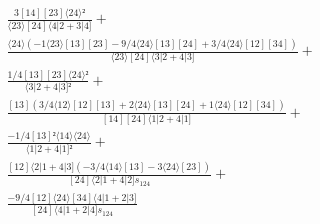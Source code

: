 \documentclass[varwidth, border=5pt]{standalone}
\begin{document}
\begin{my}
$\begin{gathered}
\scriptscriptstyle\frac{3[14][23]⟨24⟩²}{⟨23⟩[24]⟨4|2+3|4]} +\\
\scriptscriptstyle\frac{⟨24⟩(-1⟨23⟩[13][23]-9/4⟨24⟩[13][24]+3/4⟨24⟩[12][34])}{⟨23⟩[24]⟨3|2+4|3]} +\\
\scriptscriptstyle\frac{1/4[13][23]⟨24⟩²}{⟨3|2+4|3]²} +\\
\scriptscriptstyle\frac{[13](3/4⟨12⟩[12][13]+2⟨24⟩[13][24]+1⟨24⟩[12][34])}{[14][24]⟨1|2+4|1]} +\\
\scriptscriptstyle\frac{-1/4[13]²⟨14⟩⟨24⟩}{⟨1|2+4|1]²} +\\
\scriptscriptstyle\frac{[12]⟨2|1+4|3](-3/4⟨14⟩[13]-3⟨24⟩[23])}{[24]⟨2|1+4|2]s_{124}} +\\
\scriptscriptstyle\frac{-9/4[12]⟨24⟩[34]⟨4|1+2|3]}{[24]⟨4|1+2|4]s_{124}} \phantom{+}
\end{gathered}$
\end{my}
\end{document}
